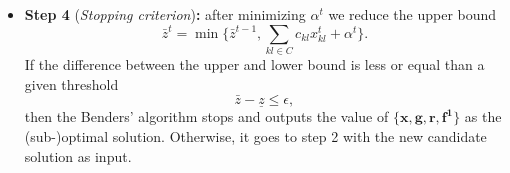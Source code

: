 \begin{itemize}
\begin{mini!}[2]
    \end{mini!}
    \item \textbf{Step 4} (\textit{Stopping criterion})\textbf{:} after minimizing $\alpha^{t}$ we reduce the upper bound
    \begin{equation}
        \bar{z}^{t} = \min \{\bar{z}^{t-1}, \sum_{kl \in C}c_{kl}x_{kl}^{t} + \alpha^{t}\}.
    \end{equation}
    If the difference between the upper and lower bound is less or equal than a given threshold
    \begin{equation}
        \bar{z} - \underline{z} \leq \epsilon,
    \end{equation}
    then the Benders' algorithm stops and outputs the value of $\{\mathbf{x},\mathbf{g},\mathbf{r},\mathbf{f^{1}}\}$ as the (sub-)optimal solution. Otherwise, it goes to step 2 with the new candidate solution as input.
\end{itemize}

